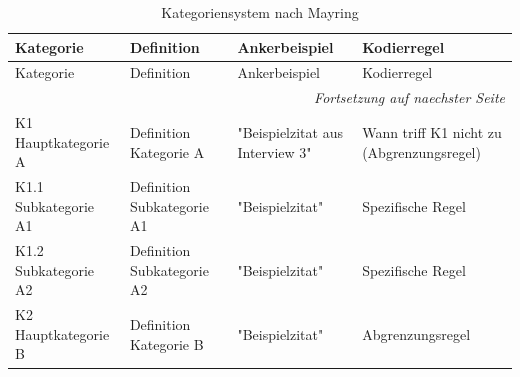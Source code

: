 
\begin{longtable}{p{3cm}p{4cm}p{4cm}p{3cm}}
\caption{Kategoriensystem nach Mayring}\label{tab:kategoriensystem}\\
\toprule
Kategorie & Definition & Ankerbeispiel & Kodierregel \\
\midrule
\endfirsthead

\toprule
Kategorie & Definition & Ankerbeispiel & Kodierregel \\
\midrule
\endhead

\bottomrule
\multicolumn{4}{r}{\textit{Fortsetzung auf naechster Seite}} \\
\endfoot

\bottomrule
\endlastfoot

K1 Hauptkategorie A & Definition Kategorie A & "Beispielzitat aus Interview 3" & Wann triff K1 nicht zu (Abgrenzungsregel) \\
\addlinespace
K1.1 Subkategorie A1 & Definition Subkategorie A1 & "Beispielzitat" & Spezifische Regel \\
\addlinespace
K1.2 Subkategorie A2 & Definition Subkategorie A2 & "Beispielzitat" & Spezifische Regel \\
\addlinespace
K2 Hauptkategorie B & Definition Kategorie B & "Beispielzitat" & Abgrenzungsregel \\
\end{longtable}
